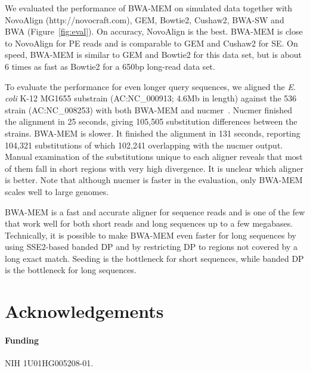 \documentclass{bioinfo}
\begin{document}
We evaluated the performance of BWA-MEM on simulated data together with
NovoAlign (http://novocraft.com), GEM, Bowtie2, Cushaw2, BWA-SW and BWA
(Figure~\ref{fig:eval}). On accuracy, NovoAlign is the best. BWA-MEM is close
to NovoAlign for PE reads and is comparable to GEM and Cushaw2 for SE.  On
speed, BWA-MEM is similar to GEM and Bowtie2 for this data set, but is about
6 times as fast as Bowtie2 for a 650bp long-read data set.

To evaluate the performance for even longer query sequences, we aligned the
{\it E. coli} K-12 MG1655 substrain (AC:NC\_000913; 4.6Mb in length) against
the 536 strain (AC:NC\_008253) with both BWA-MEM and
nucmer~\citep{Kurtz:2004zr}. Nucmer finished the alignment in 25 seconds,
giving 105,505 substitution differences between the strains. BWA-MEM is slower.
It finished the alignment in 131 seconds, reporting 104,321 substitutions of
which 102,241 overlapping with the nucmer output. Manual examination of the
substitutions unique to each aligner reveals that most of them fall in short
regions with very high divergence. It is unclear which aligner is better. Note
that although nucmer is faster in the evaluation, only BWA-MEM scales well to
large genomes.

BWA-MEM is a fast and accurate aligner for sequence reads and is one of the few
that work well for both short reads and long sequences up to a few megabases.
Technically, it is possible to make BWA-MEM even faster for long sequences by
using SSE2-based banded DP and by restricting DP to regions not covered by a
long exact match. Seeding is the bottleneck for short sequences, while banded
DP is the bottleneck for long sequences.

\section{Acknowledgements}
\paragraph{Funding\textcolon} NIH 1U01HG005208-01.

\end{document}
